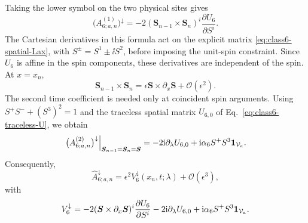 Taking the lower symbol on the two physical sites gives
\begin{equation}
\bigl(A^{(1)}_{6;a,n}\bigr)^\downarrow
=-2(\boldsymbol S_{n-1}\times\boldsymbol S_n)^i
\frac{\partial U_6}{\partial S^i}.
\label{eq:class6-A1-lower-symbol}
\end{equation}
The Cartesian derivatives in this formula act on the explicit matrix
\eqref{eq:class6-spatial-Lax}, with $S^\pm=S^1\pm\ii S^2$, before imposing
the unit-spin constraint.  Since $U_6$ is affine in the spin components,
these derivatives are independent of the spin.  At $x=x_n$,
\begin{equation}
\boldsymbol S_{n-1}\times\boldsymbol S_n
=\epsilon\boldsymbol S\times\partial_x\boldsymbol S
+\mathcal O(\epsilon^2).
\label{eq:class6-neighbour-cross-product}
\end{equation}
The second time coefficient is needed only at coincident spin arguments.
Using $S^+S^-+(S^3)^2=1$ and the traceless spatial matrix
$U_{6,0}$ of Eq.~\eqref{eq:class6-traceless-U}, we obtain
\begin{equation}
\left.\bigl(A^{(2)}_{6;a,n}\bigr)^\downarrow
\right|_{\boldsymbol S_{n-1}=\boldsymbol S_n=\boldsymbol S}
=-2\mathrm{i}\partial_\lambda U_{6,0}
+\mathrm{i}\alpha_6S^+S^3\mathbf{1}_{\mathcal V_a}.
\label{eq:class6-A2-lower-symbol}
\end{equation}
Consequently,
\begin{equation}
\widehat A_{6;a,n}^\downarrow
=\epsilon^2V_6^\downarrow(x_n,t;\lambda)
+\mathcal O(\epsilon^3),
\label{eq:class6-A-lower-expansion}
\end{equation}
with
\begin{equation}
V_6^\downarrow
=-2(\boldsymbol S\times\partial_x\boldsymbol S)^i
\frac{\partial U_6}{\partial S^i}
-2\mathrm{i}\partial_\lambda U_{6,0}
+\mathrm{i}\alpha_6S^+S^3\mathbf{1}_{\mathcal V_a}.
\label{eq:class6-Vdown-direct}
\end{equation}

